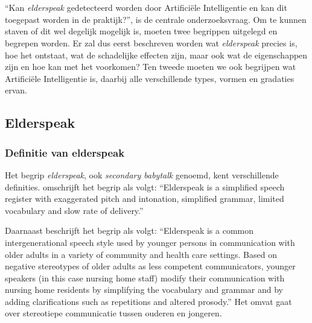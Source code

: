 \chapter{}
\label{ch:stand-van-zaken}



``Kan \textit{elderspeak} gedetecteerd worden door Artificiële Intelligentie en kan dit toegepast worden in de praktijk?'', is de centrale onderzoeksvraag. 
Om te kunnen staven of dit wel degelijk mogelijk is, moeten twee begrippen uitgelegd en begrepen worden.
Er zal dus eerst beschreven worden wat \textit{elderspeak} precies is, hoe het ontstaat, wat de schadelijke effecten zijn, maar ook wat de eigenschappen zijn en hoe kan met het voorkomen?
Ten tweede moeten we ook begrijpen wat Artificiële Intelligentie is, daarbij alle verschillende types, vormen en gradaties ervan.

\section{Elderspeak}

\subsection{Definitie van elderspeak}

Het begrip \textit{elderspeak}, ook \textit{secondary babytalk} genoemd, kent verschillende definities. \textcite{Kemper1998} omschrijft het begrip als volgt:
``Elderspeak is a simplified speech register with exaggerated pitch and intonation, simplified grammar, limited vocabulary and slow rate of delivery.''

Daarnaast beschrijft \textcite{Williams2011} het begrip als volgt:
``Elderspeak is a common intergenerational speech style used by younger persons in communication with older adults in a variety of community and health care settings. Based on negative stereotypes of older adults as less competent communicators, younger speakers (in this case nursing home staff) modify their communication with nursing home residents by simplifying the vocabulary and grammar and by adding clarifications such as repetitions and altered prosody.'' Het omvat gaat over stereotiepe communicatie tussen ouderen en jongeren.

